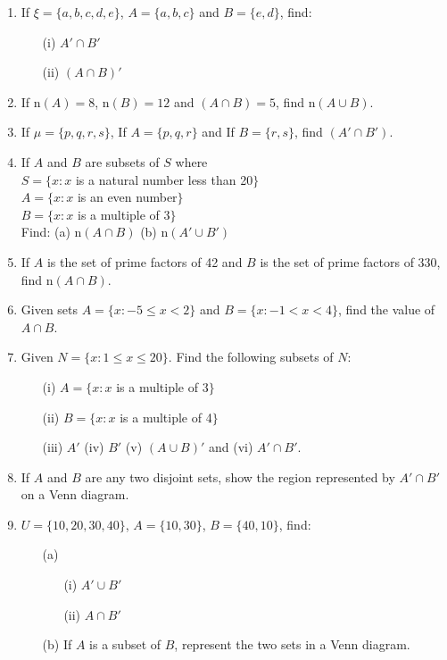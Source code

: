 \begin{enumerate}
	\item If $\xi = \{a, b, c, d, e\}$, $A = \{a, b, c\}$ and $B = \{e, d\}$, find:
		\begin{itemize}
		\item[(i)] $A' \cap B'$
		\item[(ii)] $(A \cap B)'$
		\end{itemize}
		
	\item If n$(A) = 8$, n$(B) = 12$ and $(A \cap B) = 5$, find n$(A \cup B)$.
		
	\item If $\mu = \{p, q, r, s\}$, If $A = \{p, q, r\}$ and If $B = \{r, s\}$, find $(A' \cap B')$.
		
	\item If $A$ and $B$ are subsets of $S$ where\\
	$S = \{x: x$ is a natural number less than 20$\}$\\
	$A = \{x: x$ is an even number$\}$\\
	$B = \{x: x$ is a multiple of 3$\}$\\
	Find: (a) n$(A \cap B)$ \quad (b) n$(A' \cup B')$
	
	\item If $A$ is the set of prime factors of 42 and $B$ is the set of prime factors of 330, find n$(A \cap B)$.
	
	\item Given sets $A = \{x:-5 \leq x < 2\}$ and $B = \{x:-1 < x < 4\}$, find the value of $A \cap B$.
	
	\item Given $N = \{x:1 \leq x \leq 20\}$. Find the following subsets of $N$:
		\begin{itemize}
		\item[(i)] $A = \{x: x$ is a multiple of 3$\}$
		\item[(ii)] $B = \{x: x$ is a multiple of 4$\}$
		\item[(iii)] $A'$ \quad (iv) $B'$ \quad (v) $(A \cup B)'$ \quad and \quad (vi) $A' \cap B'$.
		\end{itemize}
		
	\item If $A$ and $B$ are any two disjoint sets, show the region represented by $A' \cap B'$ on a Venn diagram.
	
	\item $U = \{10, 20, 30, 40\}$, $A = \{10, 30\}$, $B = \{40, 10\}$, find:
		\begin{itemize}
		\item[(a)]
			\begin{itemize}
			\item[(i)] $A' \cup B'$
			\item[(ii)] $A \cap B'$
			\end{itemize}
		\item[(b)] If $A$ is a subset of $B$, represent the two sets in a Venn diagram.
		\end{itemize}
		

\end{enumerate}
